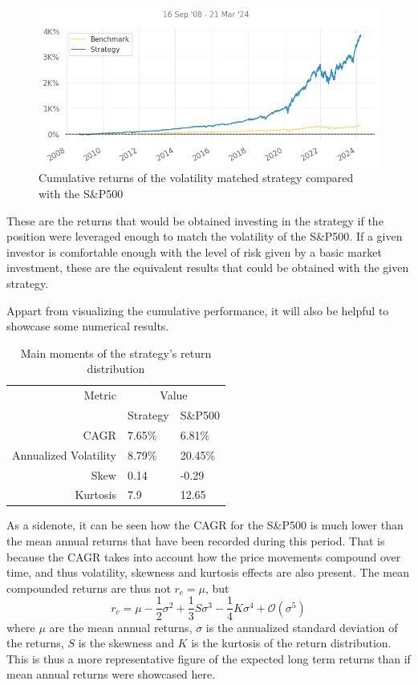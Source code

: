 \begin{figure}[ht]
    \captionsetup{justification=centering}
    \includegraphics[width=\linewidth]{assets/strat-vs-sp500-vol-matched.png}
    \caption{Cumulative returns of the volatility matched strategy compared with the S\&P500}
    \label{fig:strat-vs-sp500-vol-matched}
\end{figure}
These are the returns that would be obtained investing in the strategy if the position were leveraged enough to match the volatility of the S\&P500. If a given investor is comfortable enough with the level of risk given by a basic market investment, these are the equivalent results that could be obtained with the given strategy.

Appart from visualizing the cumulative performance, it will also be helpful to showcase some numerical results. 

\begin{table}[ht]
    \centering
    \begin{tabular}{rll}
        \toprule
        Metric & \multicolumn{2}{c}{Value} \\ 
        \cmidrule(lr){2-3}
            & Strategy & S\&P500 \\
        \midrule
        CAGR & 7.65\% & 6.81\% \\
        Annualized Volatility & 8.79\% & 20.45\% \\
        Skew & 0.14 & -0.29 \\
        Kurtosis & 7.9 & 12.65 \\
        \bottomrule
    \end{tabular}
    \caption{Main moments of the strategy's return distribution}
    \label{table:main-moments-strat-vs-sp500}
\end{table}

As a sidenote, it can be seen how the CAGR for the S\&P500 is much lower than the mean annual returns that have been recorded during this period. That is because the CAGR takes into account how the price movements compound over time, and thus volatility, skewness and kurtosis effects are also present. The mean compounded returns are thus not $r_c=\mu$, but 
\begin{equation}
    r_c=\mu-\frac{1}{2}\sigma^2+\frac{1}{3}S\sigma^3-\frac{1}{4}K\sigma^4  + \mathcal{O}\left(\sigma^5\right)
\end{equation}
where $\mu$ are the mean annual returns, $\sigma$ is the annualized standard deviation of the returns, $S$ is the skewness and $K$ is the kurtosis of the return distribution. This is thus a more representative figure of the expected long term returns than if mean annual returns were showcased here.

